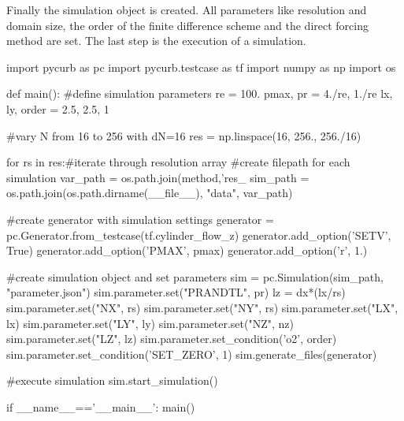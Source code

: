 Finally the simulation object is created. All parameters like resolution and domain size,
the order of the finite difference scheme and the direct forcing method are set.
The last step is the execution of a simulation.\\

\clearpage

\begin{python}[caption='Grid Convergence Study Example', label={gcstudy_papi}]
import pycurb as pc
import pycurb.testcase as tf
import numpy as np
import os

def main():
    #define simulation parameters
    re = 100.
    pmax, pr = 4./re,  1./re
    lx, ly, order = 2.5, 2.5, 1

    #vary N from 16 to 256 with dN=16
    res = np.linspace(16, 256., 256./16)

    for rs in res:#iterate through resolution array
        #create filepath for each simulation
        var_path = os.path.join(method,'res_%
        sim_path = os.path.join(os.path.dirname(__file__), "data", var_path)

        #create generator with simulation settings
        generator = pc.Generator.from_testcase(tf.cylinder_flow_z)
        generator.add_option('SETV', True)
        generator.add_option('PMAX', pmax)
        generator.add_option('r', 1.)

        #create simulation object and set parameters
        sim = pc.Simulation(sim_path, "parameter.json")
        sim.parameter.set("PRANDTL", pr)
        lz = dx*(lx/rs)
        sim.parameter.set("NX", rs)
        sim.parameter.set("NY", rs)
        sim.parameter.set("LX", lx)
        sim.parameter.set("LY", ly)
        sim.parameter.set("NZ", nz)
        sim.parameter.set("LZ", lz)
        sim.parameter.set_condition('o2', order)
        sim.parameter.set_condition('SET_ZERO', 1)
        sim.generate_files(generator)

        #execute simulation
        sim.start_simulation()

if __name__=='__main__':
    main()
\end{python}

